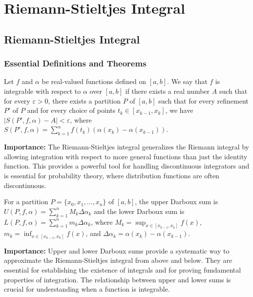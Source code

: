 \chapter{Riemann-Stieltjes Integral}

\section{Riemann-Stieltjes Integral}

\subsection*{Essential Definitions and Theorems}

\begin{definition}
Let $f$ and $\alpha$ be real-valued functions defined on $[a, b]$. We say that $f$ is integrable with respect to $\alpha$ over $[a, b]$ if there exists a real number $A$ such that for every $\varepsilon > 0$, there exists a partition $P$ of $[a, b]$ such that for every refinement $P'$ of $P$ and for every choice of points $t_k \in [x_{k-1}, x_k]$, we have $|S(P', f, \alpha) - A| < \varepsilon$, where $S(P', f, \alpha) = \sum_{k=1}^n f(t_k)(\alpha(x_k) - \alpha(x_{k-1}))$.
\end{definition}

\noindent\textbf{Importance:} The Riemann-Stieltjes integral generalizes the Riemann integral by allowing integration with respect to more general functions than just the identity function. This provides a powerful tool for handling discontinuous integrators and is essential for probability theory, where distribution functions are often discontinuous.



\begin{definition}
For a partition $P = \{x_0, x_1, \ldots, x_n\}$ of $[a, b]$, the upper Darboux sum is $U(P, f, \alpha) = \sum_{k=1}^n M_k \Delta\alpha_k$ and the lower Darboux sum is $L(P, f, \alpha) = \sum_{k=1}^n m_k \Delta\alpha_k$, where $M_k = \sup_{x \in [x_{k-1}, x_k]} f(x)$, $m_k = \inf_{x \in [x_{k-1}, x_k]} f(x)$, and $\Delta\alpha_k = \alpha(x_k) - \alpha(x_{k-1})$.
\end{definition}

\noindent\textbf{Importance:} Upper and lower Darboux sums provide a systematic way to approximate the Riemann-Stieltjes integral from above and below. They are essential for establishing the existence of integrals and for proving fundamental properties of integration. The relationship between upper and lower sums is crucial for understanding when a function is integrable.




